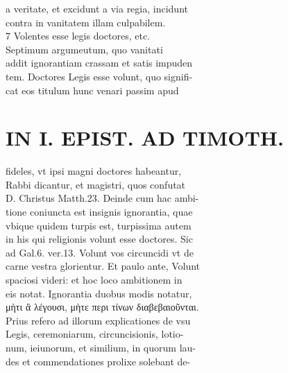 \documentclass{article}
\begin{document}
\begin{pages}
                a veritate, et excidunt a via regia, incidunt \\
                contra in vanitatem illam culpabilem. \\
                7 Volentes esse legis doctores, etc. \\
                Septimum argumeutum, quo vanitati \\
                addit ignorantiam crassam et satis impuden \\
                tem. Doctores Legis esse volunt, quo signifi- \\
                cat eos titulum hunc venari passim apud \\
                
\section*{IN I. EPIST. AD TIMOTH. \\
                }
fideles, vt ipsi magni doctores habeantur, \\
                Rabbi dicantur, et magistri, quos confutat \\
                D. Christus Matth.23. Deinde cum hac ambi- \\
                tione coniuncta est insignis ignorantia, quae \\
                vbique quidem turpis est, turpissima autem \\
                in his qui religionis volunt esse doctores. Sic \\
                ad Gal.6. ver.13. Volunt vos circuncidi vt de \\
                carne vestra glorientur. Et paulo ante, Volunt \\
                spaciosi videri: et hoc loco ambitionem in \\
                eis notat. Ignorantia duobus modis notatur, \\
                μὴτι ἂ λέγουσι, μὴτε περι τίνων διαβεβαιοῦνται. \\
                Prius refero ad illorum explicationes de vsu \\
                Legis, ceremoniarum, circuncisionis, lotio- \\
                num, ieiunorum, et similium, in quorum lau- \\
                des et commendationes prolixe solebant de- \\

\end{pages}
\end{document}
